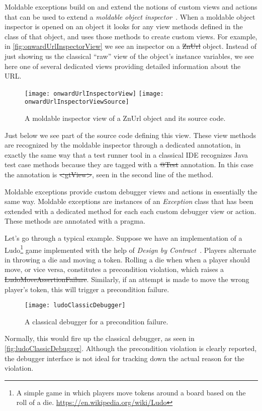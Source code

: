 \documentclass[sigplan,anonymous,review,10pt]{acmart}
\begin{document}
Moldable exceptions build on and extend the notions of custom views and actions that can be used to extend a \emph{moldable object inspector}~\cite{Chis15a}.
When a moldable object inspector is opened on an object it looks for any view methods defined in the class of that object, and uses those methods to create custom views.
For example, in \autoref{fig:onwardUrlInspectorView} we see an inspector on a \st{ZnUrl} object.
Instead of just showing us the classical ``raw'' view of the object's instance variables, we see here one of several dedicated views providing detailed information about the URL.
\begin{figure}[t]
  \texttt{[image: onwardUrlInspectorView]}
  \texttt{[image: onwardUrlInspectorViewSource]}
  \caption{A moldable inspector view of a ZnUrl object and its source code.}
  \label{fig:onwardUrlInspectorView}
\end{figure}
Just below we see part of the source code defining this view.
These view methods are recognized by the moldable inspector through a dedicated annotation, in exactly the same way that a test runner tool in a classical IDE recognizes Java test case methods because they are tagged with a \st{@Test} annotation.
In this case the annotation is \st{<gtView>}, seen in the second line of the method.

Moldable exceptions provide custom debugger views and actions in essentially the same way.
Moldable exceptions are instances of an \emph{Exception} class that has been extended with a dedicated method for each each custom debugger view or action.
These methods are annotated with a  pragma.

Let's go through a typical example.
Suppose we have an implementation of a Ludo\footnote{A simple game in which players move tokens around a board based on the roll of a die.
\url{https://en.wikipedia.org/wiki/Ludo}} game implemented with the help of \emph{Design by Contract}~\cite{Meye92b}.
Players alternate in throwing a die and moving a token.
Rolling a die when when a player should move, or vice versa, constitutes a precondition violation, which raises a \st{LudoMoveAssertionFailure}.
Similarly, if an attempt is made to move the wrong player's token, this will trigger a precondition failure.
\begin{figure}[h]
  \texttt{[image: ludoClassicDebugger]}
  \caption{A classical debugger for a precondition failure.}
  \label{fig:ludoClassicDebugger}
\end{figure}
Normally, this would fire up the classical debugger, as seen in \autoref{fig:ludoClassicDebugger}.
Although the precondition violation is clearly reported, the debugger interface is not ideal for tracking down the actual reason for the violation.
\end{document}
